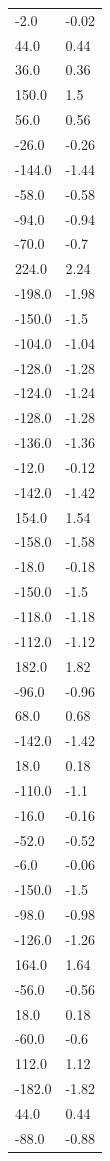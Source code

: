 \begin{longtable}{ll}
-2.0 & -0.02 \\
44.0 & 0.44 \\
36.0 & 0.36 \\
150.0 & 1.5 \\
56.0 & 0.56 \\
-26.0 & -0.26 \\
-144.0 & -1.44 \\
-58.0 & -0.58 \\
-94.0 & -0.94 \\
-70.0 & -0.7 \\
224.0 & 2.24 \\
-198.0 & -1.98 \\
-150.0 & -1.5 \\
-104.0 & -1.04 \\
-128.0 & -1.28 \\
-124.0 & -1.24 \\
-128.0 & -1.28 \\
-136.0 & -1.36 \\
-12.0 & -0.12 \\
-142.0 & -1.42 \\
154.0 & 1.54 \\
-158.0 & -1.58 \\
-18.0 & -0.18 \\
-150.0 & -1.5 \\
-118.0 & -1.18 \\
-112.0 & -1.12 \\
182.0 & 1.82 \\
-96.0 & -0.96 \\
68.0 & 0.68 \\
-142.0 & -1.42 \\
18.0 & 0.18 \\
-110.0 & -1.1 \\
-16.0 & -0.16 \\
-52.0 & -0.52 \\
-6.0 & -0.06 \\
-150.0 & -1.5 \\
-98.0 & -0.98 \\
-126.0 & -1.26 \\
164.0 & 1.64 \\
-56.0 & -0.56 \\
18.0 & 0.18 \\
-60.0 & -0.6 \\
112.0 & 1.12 \\
-182.0 & -1.82 \\
44.0 & 0.44 \\
-88.0 & -0.88 \\

\end{longtable}

